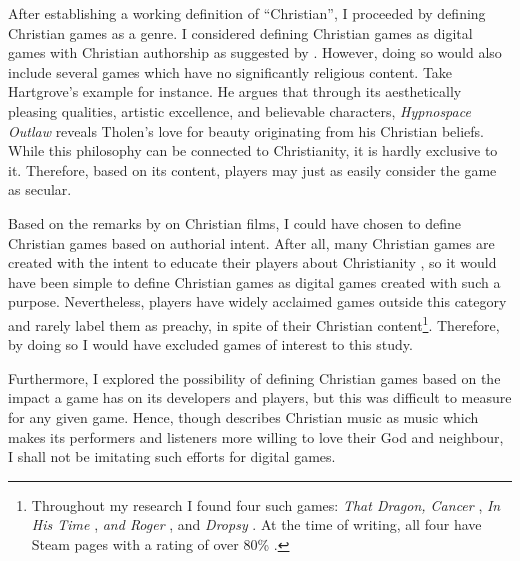 After establishing a working definition of ``Christian'', I proceeded by defining Christian games as a genre. I considered defining Christian games as digital games with Christian authorship as suggested by \textcite{hartgrove_why_2022}. However, doing so would also include several games which have no significantly religious content. Take Hartgrove's example for instance. He argues that through its aesthetically pleasing qualities, artistic excellence, and believable characters, \textit{Hypnospace Outlaw} \parencite{tholen_hypnospace_2019} reveals Tholen's love for beauty originating from his Christian beliefs. While this philosophy can be connected to Christianity, it is hardly exclusive to it. Therefore, based on its content, players may just as easily consider the game as secular.

Based on the remarks by \textcite{unthank_what_2023} on Christian films, I could have chosen to define Christian games based on authorial intent. After all, many Christian games are created with the intent to educate their players about Christianity \parencites[60]{gonzalez_born-again_2014}[303,306]{schut_swords_2026}, so it would have been simple to define Christian games as digital games created with such a purpose. Nevertheless, players have widely acclaimed games outside this category and rarely label them as preachy, in spite of their Christian content\footnote{Throughout my research I found four such games: \textit{That Dragon, Cancer} \parencite{numinous_games_that_2016}, \textit{In His Time} \parencite{yona_in_2023}, \textit{and Roger} \parencite{yona_and_2025}, and \textit{Dropsy} \parencite{tholen_dropsy_2015}. At the time of writing, all four have Steam pages with a rating of over 80\% \parencite{numinous_games_steam_2016, tearyhand_studio_steam_2023, tearyhand_studio_steam_2025, tendershoot_steam_2015}.}. Therefore, by doing so I would have excluded games of interest to this study.

Furthermore, I explored the possibility of defining Christian games based on the impact a game has on its developers and players, but this was difficult to measure for any given game. Hence, though \textcite{macinnis_what_2025} describes Christian music as music which makes its performers and listeners more willing to love their God and neighbour, I shall not be imitating such efforts for digital games.


